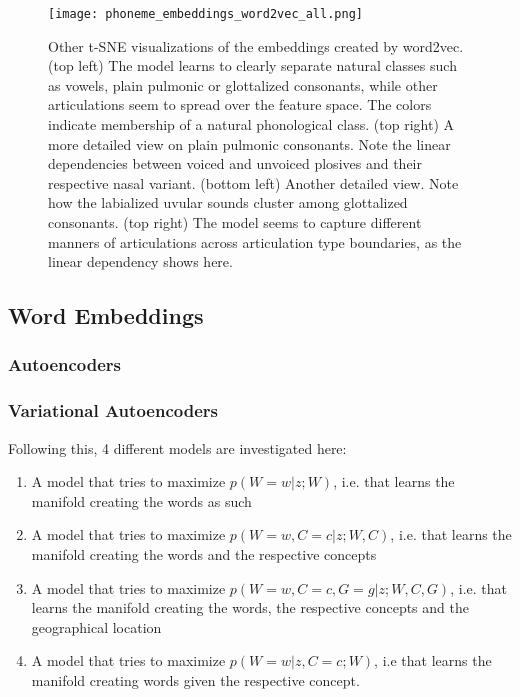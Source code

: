 \documentclass[8pt]{article}
\begin{document}
\begin{figure}[htbp] %
   \centering
   \texttt{[image: phoneme\_embeddings\_word2vec\_all.png]} 
   \caption{Other t-SNE visualizations of the embeddings created by word2vec. (top left) The model learns to clearly separate natural classes such as vowels, plain pulmonic or glottalized consonants, while other articulations seem to spread over the feature space. The colors indicate membership of a natural phonological class.  (top right) A more detailed view on plain pulmonic consonants. Note the linear dependencies between voiced and unvoiced plosives and their respective nasal variant. (bottom left) Another detailed view. Note how the labialized uvular sounds cluster among glottalized consonants. (top right) The model seems to capture different manners of articulations across articulation type boundaries, as the linear dependency shows here.}
   \label{fig:word2vec_all}
\end{figure}

\subsection{Word Embeddings}

\subsubsection{Autoencoders}
\subsubsection{Variational Autoencoders}

Following this, 4 different models are investigated here:
\begin{enumerate}
\item A model that tries to maximize $p(W=w|z;W)$, i.e. that learns the manifold creating the words as such
\item A model that tries to maximize $p(W=w,C=c|z;W,C)$, i.e. that learns the manifold creating the words and the respective concepts
\item A model that tries to maximize $p(W=w,C=c,G=g|z;W,C,G)$, i.e. that learns the manifold creating the words, the respective concepts and the geographical location
\item A model that tries to maximize $p(W=w|z,C=c;W)$, i.e that learns the manifold creating words given the respective concept.
\end{enumerate}
\end{document}
